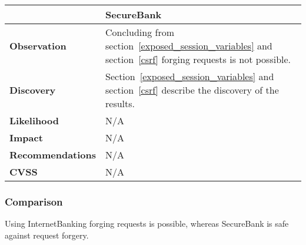 \begin{longtable}[l]{ p{} | p{} }\hline
    & \textbf{SecureBank} \\ \hline
    \textbf{Observation} & Concluding from section~\ref{exposed_session_variables} and section~\ref{csrf} forging requests is not possible. \\
    \textbf{Discovery} & Section~\ref{exposed_session_variables} and section~\ref{csrf} describe the discovery of the results. \\
    \textbf{Likelihood} & N/A \\
    \textbf{Impact} & N/A \\
    \textbf{Recommen\-dations} & N/A \\ \hline
    \textbf{CVSS} & N/A \\ \hline
\end{longtable}

\subsubsection{Comparison}
Using InternetBanking forging requests is possible, whereas SecureBank is safe against request forgery.
\clearpage